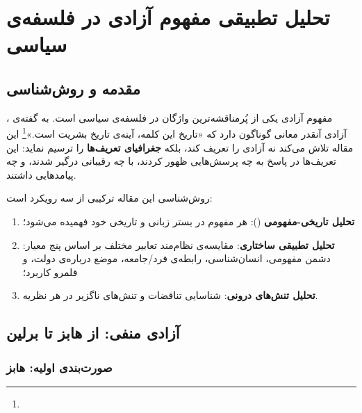 \section{تحلیل تطبیقی مفهوم آزادی در فلسفه‌ی سیاسی}
\label{sec:main}

\subsection{مقدمه و روش‌شناسی}
\label{subsec:intro}

مفهوم آزادی یکی از پُرمناقشه‌ترین واژگان در فلسفه‌ی سیاسی است. به گفته‌ی ، آزادی آنقدر معانی گوناگون دارد که «تاریخ این کلمه، آینه‌ی تاریخ بشریت است.»\footnote{} این مقاله تلاش می‌کند نه آزادی را تعریف کند، بلکه \textbf{جغرافیای تعریف‌ها} را ترسیم نماید: این تعریف‌ها در پاسخ به چه پرسش‌هایی ظهور کردند، با چه رقیبانی درگیر شدند، و چه پیامدهایی داشتند. %

روش‌شناسی این مقاله ترکیبی از سه رویکرد است:

\begin{enumerate}
  \item \textbf{تحلیل تاریخی-مفهومی} (): هر مفهوم در بستر زبانی و تاریخی خود فهمیده می‌شود؛ %
  \item \textbf{تحلیل تطبیقی ساختاری}: مقایسه‌ی نظام‌مند تعابیر مختلف بر اساس پنج معیار: دشمن مفهومی، انسان‌شناسی، رابطه‌ی فرد/جامعه، موضع درباره‌ی دولت، و قلمرو کاربرد؛
  \item \textbf{تحلیل تنش‌های درونی}: شناسایی تناقضات و تنش‌های ناگزیر در هر نظریه.
\end{enumerate}

\subsection{آزادی منفی: از هابز تا برلین}
\label{subsec:negative}

\subsubsection{صورت‌بندی اولیه: هابز}


